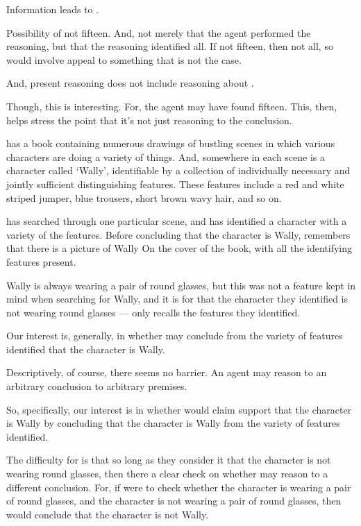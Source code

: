 \begin{note}
  Information leads to \requ{}.

  Possibility of not fifteen.
  And, not merely that the agent performed the reasoning, but that the reasoning identified all.
  If not fifteen, then not all, so would involve appeal to something that is not the case.

  And, present reasoning does not include reasoning about \requ{}.
\end{note}

\begin{note}
  \color{red}
  Though, this is interesting.
  For, the agent may have found fifteen.
  This, then, helps stress the point that it's not just reasoning to the conclusion.
\end{note}


\begin{note}[Wally]
  \begin{illustration}
    \label{illu:CS:wheres-wally}
     has a book containing numerous drawings of bustling scenes in which various characters are doing a variety of things.
    And, somewhere in each scene is a character called `Wally', identifiable by a collection of individually necessary and jointly sufficient distinguishing features.
    These features include a red and white striped jumper, blue trousers, short brown wavy hair, and so on.

     has searched through one particular scene, and has identified a character with a variety of the features.
    Before concluding that the character is Wally,  remembers that there is a picture of Wally On the cover of the book, with all the identifying features present.

    Wally is always wearing a pair of round glasses, but this was not a feature  kept in mind when searching for Wally, and it is \epVAd{} for  that the character they identified is not wearing round glasses  ---  only recalls the features they identified.
  \end{illustration}

  Our interest is, generally, in whether  may conclude from the variety of features identified that the character is Wally.

  Descriptively, of course, there seems no barrier.
  An agent may reason to an arbitrary conclusion to arbitrary premises.

  So, specifically, our interest is in whether  would claim support that the character is Wally by concluding that the character is Wally from the variety of features identified.

  The difficulty for  is that so long as they consider it \epVAd{} that the character is not wearing round glasses, then there a clear check on whether  may reason to a different conclusion.
  For, if  were to check whether the character is wearing a pair of round glasses, and the character is not wearing a pair of round glasses, then  would conclude that the character is not Wally.
\end{note}


